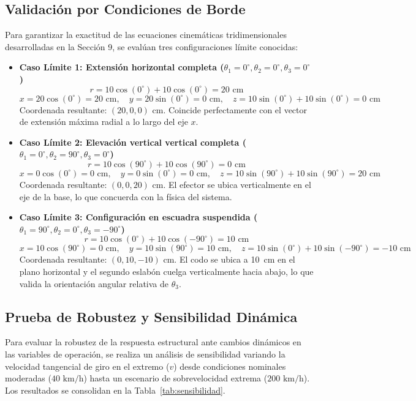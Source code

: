 \documentclass[11pt,a4paper]{article}
\begin{document}
\subsection{Validación por Condiciones de Borde}
Para garantizar la exactitud de las ecuaciones cinemáticas tridimensionales desarrolladas en la Sección 9, se evalúan tres configuraciones límite conocidas:
\begin{itemize}
    \item \textbf{Caso Límite 1: Extensión horizontal completa ($\theta_1 = 0^\circ, \theta_2 = 0^\circ, \theta_3 = 0^\circ$)}
    $$r = 10\cos(0^\circ) + 10\cos(0^\circ) = 20\text{ cm}$$
    $$x = 20\cos(0^\circ) = 20\text{ cm}, \quad y = 20\sin(0^\circ) = 0\text{ cm}, \quad z = 10\sin(0^\circ) + 10\sin(0^\circ) = 0\text{ cm}$$
    Coordenada resultante: $(20, 0, 0)\text{ cm}$. Coincide perfectamente con el vector de extensión máxima radial a lo largo del eje $x$.
    \item \textbf{Caso Límite 2: Elevación vertical vertical completa ($\theta_1 = 0^\circ, \theta_2 = 90^\circ, \theta_3 = 0^\circ$)}
    $$r = 10\cos(90^\circ) + 10\cos(90^\circ) = 0\text{ cm}$$
    $$x = 0\cos(0^\circ) = 0\text{ cm}, \quad y = 0\sin(0^\circ) = 0\text{ cm}, \quad z = 10\sin(90^\circ) + 10\sin(90^\circ) = 20\text{ cm}$$
    Coordenada resultante: $(0, 0, 20)\text{ cm}$. El efector se ubica verticalmente en el eje de la base, lo que concuerda con la física del sistema.
    \item \textbf{Caso Límite 3: Configuración en escuadra suspendida ($\theta_1 = 90^\circ, \theta_2 = 0^\circ, \theta_3 = -90^\circ$)}
    $$r = 10\cos(0^\circ) + 10\cos(-90^\circ) = 10\text{ cm}$$
    $$x = 10\cos(90^\circ) = 0\text{ cm}, \quad y = 10\sin(90^\circ) = 10\text{ cm}, \quad z = 10\sin(0^\circ) + 10\sin(-90^\circ) = -10\text{ cm}$$
    Coordenada resultante: $(0, 10, -10)\text{ cm}$. El codo se ubica a 10~cm en el plano horizontal y el segundo eslabón cuelga verticalmente hacia abajo, lo que valida la orientación angular relativa de $\theta_3$.
\end{itemize}

\subsection{Prueba de Robustez y Sensibilidad Dinámica}
Para evaluar la robustez de la respuesta estructural ante cambios dinámicos en las variables de operación, se realiza un análisis de sensibilidad variando la velocidad tangencial de giro en el extremo ($v$) desde condiciones nominales moderadas ($40\text{ km/h}$) hasta un escenario de sobrevelocidad extrema ($200\text{ km/h}$). Los resultados se consolidan en la Tabla~\ref{tab:sensibilidad}.
\end{document}
